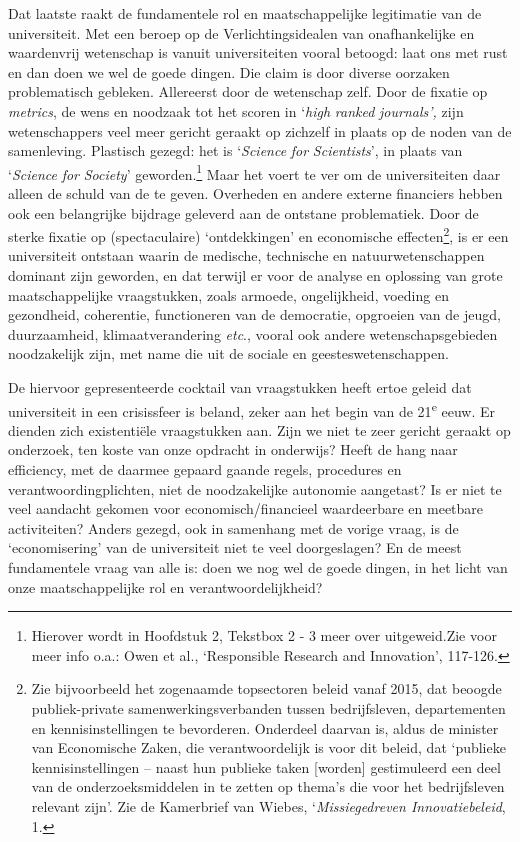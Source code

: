 \documentclass[smallauthor, chapterhaspagenum, nochapterinheader, pagenuminheader,  bigchapnum,medium2, tocpages, garamond, titleinheader]{jote-book}
\begin{document}
	Dat laatste raakt de fundamentele rol en maatschappelijke legitimatie van de universiteit. Met een beroep op de Verlichtingsidealen van onafhankelijke en waardenvrij wetenschap is vanuit universiteiten vooral betoogd: laat ons met rust en dan doen we wel de goede dingen. Die claim is door diverse oorzaken problematisch gebleken. Allereerst door de wetenschap zelf. Door de fixatie op \emph{metrics}, de wens en noodzaak tot het scoren in ‘\emph{high }\emph{ranked}\emph{ }\emph{journals}\emph{'}\emph{, }zijn wetenschappers veel meer gericht geraakt op zichzelf in plaats op de noden van de samenleving. Plastisch gezegd: het is ‘\emph{Science}\emph{ }\emph{for}\emph{ }\emph{Scientists}', in plaats van ‘\emph{Science}\emph{ }\emph{for}\emph{ Society}' geworden.\footnote{Hierover wordt in Hoofdstuk 2, Tekstbox 2 - 3 meer over uitgeweid.Zie voor meer info o.a.: Owen et al., ‘Responsible Research and Innovation', 117-126. } Maar het voert te ver om de universiteiten daar alleen de schuld van de te geven. Overheden en andere externe financiers hebben ook een belangrijke bijdrage geleverd aan de ontstane problematiek. Door de sterke fixatie op (spectaculaire) ‘ontdekkingen' en economische effecten\footnote{Zie bijvoorbeeld het zogenaamde topsectoren beleid vanaf 2015, dat beoogde publiek-private samenwerkingsverbanden tussen bedrijfsleven, departementen en kennisinstellingen te bevorderen. Onderdeel daarvan is, aldus de minister van Economische Zaken, die verantwoordelijk is voor dit beleid, dat ‘publieke kennisinstellingen -- naast hun publieke taken [worden] gestimuleerd een deel van de onderzoeksmiddelen in te zetten op thema's die voor het bedrijfsleven relevant zijn'. Zie de Kamerbrief van Wiebes, ‘\emph{Missiegedreven Innovatiebeleid}, 1. }, is er een universiteit ontstaan waarin de medische, technische en natuurwetenschappen dominant zijn geworden, en dat terwijl er voor de analyse en oplossing van grote maatschappelijke vraagstukken, zoals armoede, ongelijkheid, voeding en gezondheid, coherentie, functioneren van de democratie, opgroeien van de jeugd, duurzaamheid, klimaatverandering \emph{etc}., vooral ook andere wetenschapsgebieden noodzakelijk zijn, met name die uit de sociale en geesteswetenschappen.



	De hiervoor gepresenteerde cocktail van vraagstukken heeft ertoe geleid dat universiteit in een crisissfeer is beland, zeker aan het begin van de 21\textsuperscript{e} eeuw. Er dienden zich existentiële vraagstukken aan. Zijn we niet te zeer gericht geraakt op onderzoek, ten koste van onze opdracht in onderwijs? Heeft de hang naar efficiency, met de daarmee gepaard gaande regels, procedures en verantwoordingplichten, niet de noodzakelijke autonomie aangetast? Is er niet te veel aandacht gekomen voor economisch/financieel waardeerbare en meetbare activiteiten? Anders gezegd, ook in samenhang met de vorige vraag, is de ‘economisering' van de universiteit niet te veel doorgeslagen? En de meest fundamentele vraag van alle is: doen we nog wel de goede dingen, in het licht van onze maatschappelijke rol en verantwoordelijkheid?
\end{document}
